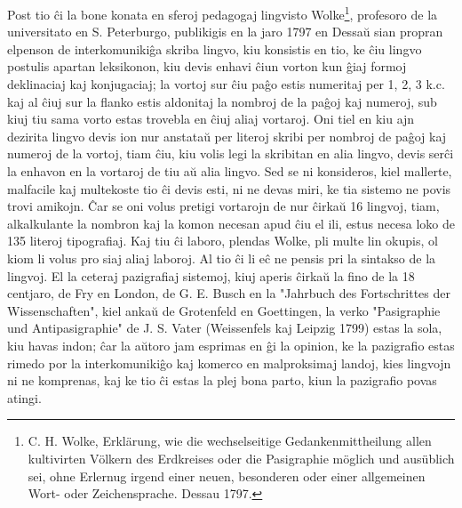    Post tio \^ci la bone konata en sferoj pedagogaj lingvisto Wolke\footnote{C. H. Wolke,
Erklärung, wie die wechselseitige Gedankenmittheilung allen
kultivirten Völkern des Erdkreises oder die Pasigraphie möglich
und ausüblich sei, ohne Erlernug irgend einer neuen, besonderen
oder einer allgemeinen Wort- oder Zeichensprache. Dessau 1797.},
profesoro de la universitato en S. Peterburgo, publikigis en la jaro
1797 en Dessa\u u sian propran elpenson de interkomuniki\^ga skriba
lingvo, kiu konsistis en tio, ke \^ciu lingvo postulis apartan
leksikonon, kiu devis enhavi \^ciun vorton kun \^giaj formoj
deklinaciaj kaj konjugaciaj; la vortoj sur \^ciu pa\^go estis
numeritaj per 1, 2, 3 k.c. kaj al \^ciuj sur la flanko estis
aldonitaj la nombroj de la pa\^goj kaj numeroj, sub kiuj tiu sama
vorto estas trovebla en \^ciuj aliaj vortaroj. Oni tiel en kiu ajn
dezirita lingvo devis ion nur anstata\u u per literoj skribi per
nombroj de pa\^goj kaj numeroj de la vortoj, tiam \^ciu, kiu volis
legi la skribitan en alia lingvo, devis ser\^ci la enhavon en la
vortaroj de tiu a\u u alia lingvo. Sed se ni konsideros, kiel
mallerte, malfacile kaj multekoste tio \^ci devis esti, ni ne devas
miri, ke tia sistemo ne povis trovi amikojn. \^Car se oni volus
pretigi vortarojn de nur \^cirka\u u 16 lingvoj, tiam, alkalkulante
la nombron kaj la komon necesan apud \^ciu el ili, estus necesa loko
de 135 literoj tipografiaj. Kaj tiu \^ci laboro, plendas Wolke, pli
multe lin okupis, ol kiom li volus pro siaj aliaj laboroj. Al tio
\^ci li e\^c ne pensis pri la sintakso de la lingvoj. El la ceteraj
pazigrafiaj sistemoj, kiuj aperis \^cirka\u u la fino de la 18
centjaro, de Fry en London, de G. E. Busch en la "Jahrbuch des
Fortschrittes der Wissenschaften", kiel anka\u u de Grotenfeld en
Goettingen, la verko "Pasigraphie und Antipasigraphie" de J. S.
Vater (Weissenfels kaj Leipzig 1799) estas la sola, kiu havas indon;
\^car la a\u utoro jam esprimas en \^gi la opinion, ke la pazigrafio
estas rimedo por la interkomuniki\^go kaj komerco en malproksimaj
landoj, kies lingvojn ni ne komprenas, kaj ke tio \^ci estas la plej
bona parto, kiun la pazigrafio povas atingi.

